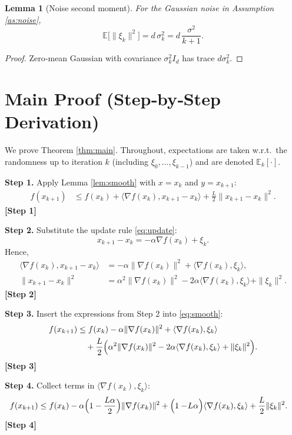 \documentclass{article}
\newtheorem{lemma}{Lemma}
\newcommand{\E}{\mathbb{E}}
\begin{document}
\begin{lemma}[Noise second moment]\label{lem:noise}
For the Gaussian noise in Assumption \ref{as:noise},
\[
\E\!\bigl[\|\xi_{k}\|^{2}\bigr]=d\,\sigma_{k}^{2}=d\,\frac{\sigma^{2}}{k+1}.
\]
\end{lemma}
\begin{proof}
Zero‑mean Gaussian with covariance $\sigma_{k}^{2}I_{d}$ has trace $d\sigma_{k}^{2}$.
\end{proof}

\section*{Main Proof (Step‑by‑Step Derivation)}
We prove Theorem \ref{thm:main}. Throughout, expectations are taken w.r.t.\ the randomness up to iteration $k$ (including $\xi_{0},\dots,\xi_{k-1}$) and are denoted $\E_{k}[\cdot]$.

\bigskip
\noindent\textbf{Step 1.} Apply Lemma \ref{lem:smooth} with $x=x_{k}$ and $y=x_{k+1}$:
\begin{align}
f(x_{k+1}) &\le f(x_{k})+\langle\nabla f(x_{k}),x_{k+1}-x_{k}\rangle
+\frac{L}{2}\|x_{k+1}-x_{k}\|^{2}. \label{eq:smooth}
\end{align}
\textbf{[Step 1]}

\noindent\textbf{Step 2.} Substitute the update rule \eqref{eq:update}:
\[
x_{k+1}-x_{k}= -\alpha\nabla f(x_{k})+\xi_{k}.
\]
Hence,
\begin{align}
\langle\nabla f(x_{k}),x_{k+1}-x_{k}\rangle
&= -\alpha\|\nabla f(x_{k})\|^{2}+\langle\nabla f(x_{k}),\xi_{k}\rangle, \\
\|x_{k+1}-x_{k}\|^{2}
&= \alpha^{2}\|\nabla f(x_{k})\|^{2}
   -2\alpha\langle\nabla f(x_{k}),\xi_{k}\rangle
   +\|\xi_{k}\|^{2}.
\end{align}
\textbf{[Step 2]}

\noindent\textbf{Step 3.} Insert the expressions from Step 2 into \eqref{eq:smooth}:
\begin{align}
f(x_{k+1}) &\le f(x_{k})
-\alpha\|\nabla f(x_{k})\|^{2}
+\langle\nabla f(x_{k}),\xi_{k}\rangle \nonumber\\
&\quad +\frac{L}{2}\Bigl(
\alpha^{2}\|\nabla f(x_{k})\|^{2}
-2\alpha\langle\nabla f(x_{k}),\xi_{k}\rangle
+\|\xi_{k}\|^{2}
\Bigr). \label{eq:expand}
\end{align}
\textbf{[Step 3]}

\noindent\textbf{Step 4.} Collect terms in $\langle\nabla f(x_{k}),\xi_{k}\rangle$:
\begin{align}
f(x_{k+1}) &\le f(x_{k})
-\alpha\Bigl(1-\frac{L\alpha}{2}\Bigr)\|\nabla f(x_{k})\|^{2}
+\Bigl(1-\!L\alpha\Bigr)\langle\nabla f(x_{k}),\xi_{k}\rangle
+\frac{L}{2}\|\xi_{k}\|^{2}. \label{eq:collected}
\end{align}
\textbf{[Step 4]}
\end{document}
